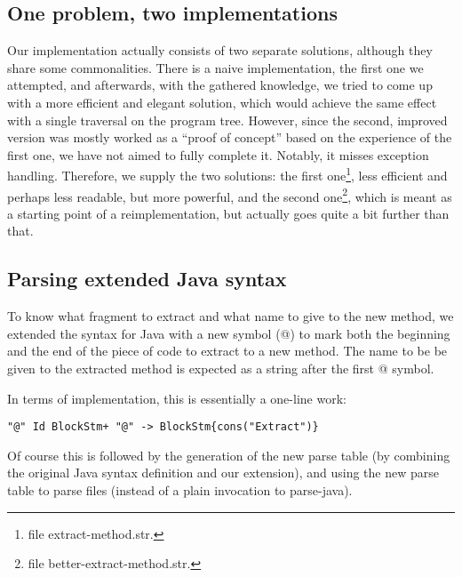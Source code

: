 \documentclass[a4paper,10pt]{article}
\begin{document}
\subsection{One problem, two implementations}
Our implementation actually consists of two separate solutions,
although they share some commonalities. There is a naive
implementation, the first one we attempted, and afterwards, with the
gathered knowledge, we tried to come up with a more efficient and
elegant solution, which would achieve the same effect with a single
traversal on the program tree. However, since the second, improved
version was mostly worked as a ``proof of concept'' based on the
experience of the first one, we have not aimed to fully complete it.
Notably, it misses exception handling. Therefore, we supply the two
solutions: the first one\footnote{file \textsf{extract-method.str.}},
less efficient and perhaps less readable, but more powerful, and the
second one\footnote{file \textsf{better-extract-method.str.}}, which
is meant as a starting point of a reimplementation, but actually goes
quite a bit further than that.

\subsection{Parsing extended Java syntax}
To know what fragment to extract and what name to give to the new
method, we extended the syntax for Java with a new symbol
(\textsf{@}) to mark both the beginning and the end of the piece of
code to extract to a new method. The name to be be given to the extracted
method is expected as a string after the first \textsf{@} symbol.

In terms of implementation, this is essentially a one-line work:
\begin{lstlisting}[basicstyle=\small,breaklines=true,frame=single]
"@" Id BlockStm+ "@" -> BlockStm{cons("Extract")}
\end{lstlisting}
Of course this is followed by the generation of the new parse table
(by combining the original Java syntax definition and our extension),
and using the new parse table to parse files (instead of a plain
invocation to \textsf{parse-java}).
\end{document}
